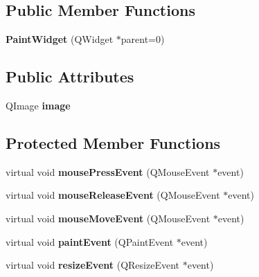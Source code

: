 \subsection*{Public Member Functions}
\begin{DoxyCompactItemize}
\item 
{\bfseries Paint\+Widget} (Q\+Widget $\ast$parent=0)\hypertarget{class_paint_widget_ae6adf05aa99501c9309ca72ccbcafee4}{}\label{class_paint_widget_ae6adf05aa99501c9309ca72ccbcafee4}

\end{DoxyCompactItemize}
\subsection*{Public Attributes}
\begin{DoxyCompactItemize}
\item 
Q\+Image {\bfseries image}\hypertarget{class_paint_widget_af256e4154c8f1e9cae1016923b40508c}{}\label{class_paint_widget_af256e4154c8f1e9cae1016923b40508c}

\end{DoxyCompactItemize}
\subsection*{Protected Member Functions}
\begin{DoxyCompactItemize}
\item 
virtual void {\bfseries mouse\+Press\+Event} (Q\+Mouse\+Event $\ast$event)\hypertarget{class_paint_widget_a1c7eb81a97caded4a094b978695c94d4}{}\label{class_paint_widget_a1c7eb81a97caded4a094b978695c94d4}

\item 
virtual void {\bfseries mouse\+Release\+Event} (Q\+Mouse\+Event $\ast$event)\hypertarget{class_paint_widget_ae1eb322803e4a255a2db108410ac8f35}{}\label{class_paint_widget_ae1eb322803e4a255a2db108410ac8f35}

\item 
virtual void {\bfseries mouse\+Move\+Event} (Q\+Mouse\+Event $\ast$event)\hypertarget{class_paint_widget_a66e1dca2bebbba5d84e8dab66c05e2db}{}\label{class_paint_widget_a66e1dca2bebbba5d84e8dab66c05e2db}

\item 
virtual void {\bfseries paint\+Event} (Q\+Paint\+Event $\ast$event)\hypertarget{class_paint_widget_ae4a27141cb8bef3cf93889fec4fc9411}{}\label{class_paint_widget_ae4a27141cb8bef3cf93889fec4fc9411}

\item 
virtual void {\bfseries resize\+Event} (Q\+Resize\+Event $\ast$event)\hypertarget{class_paint_widget_ac8ba3ebb21b873fccde32329f7d3d55d}{}\label{class_paint_widget_ac8ba3ebb21b873fccde32329f7d3d55d}

\end{DoxyCompactItemize}


